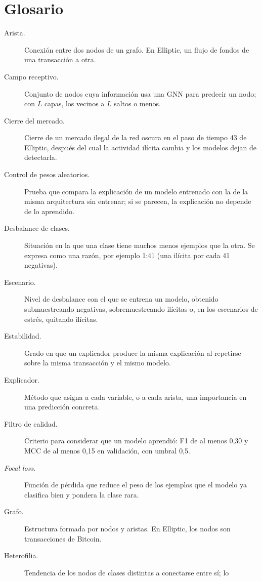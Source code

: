 \chapter{Glosario}\label{anx:glosario}

\begin{description}
  \item[Arista.] Conexión entre dos nodos de un grafo. En Elliptic, un flujo de fondos de una
        transacción a otra.
  \item[Campo receptivo.] Conjunto de nodos cuya información usa una GNN para predecir un nodo;
        con $L$ capas, los vecinos a $L$ saltos o menos.
  \item[Cierre del mercado.] Cierre de un mercado ilegal de la red oscura en el paso de tiempo 43
        de Elliptic, después del cual la actividad ilícita cambia y los modelos dejan de
        detectarla.
  \item[Control de pesos aleatorios.] Prueba que compara la explicación de un modelo entrenado
        con la de la misma arquitectura sin entrenar; si se parecen, la explicación no depende de
        lo aprendido.
  \item[Desbalance de clases.] Situación en la que una clase tiene muchos menos ejemplos que la
        otra. Se expresa como una razón, por ejemplo 1:41 (una ilícita por cada 41 negativas).
  \item[Escenario.] Nivel de desbalance con el que se entrena un modelo, obtenido submuestreando
        negativas, sobremuestreando ilícitas o, en los escenarios de estrés, quitando ilícitas.
  \item[Estabilidad.] Grado en que un explicador produce la misma explicación al repetirse sobre
        la misma transacción y el mismo modelo.
  \item[Explicador.] Método que asigna a cada variable, o a cada arista, una importancia en una
        predicción concreta.
  \item[Filtro de calidad.] Criterio para considerar que un modelo aprendió: F1 de al menos 0,30
        y MCC de al menos 0,15 en validación, con umbral 0,5.
  \item[\textit{Focal loss}.] Función de pérdida que reduce el peso de los ejemplos que el modelo
        ya clasifica bien y pondera la clase rara.
  \item[Grafo.] Estructura formada por nodos y aristas. En Elliptic, los nodos son
        transacciones de Bitcoin.
  \item[Heterofilia.] Tendencia de los nodos de clases distintas a conectarse entre sí; lo

\end{description}
